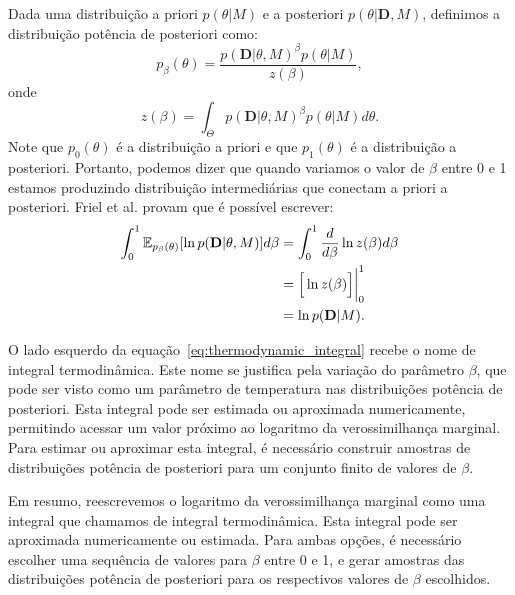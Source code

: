 \documentclass[12pt]{article}
\newcommand{\expectation}{\mathbb{E}}
\begin{document}
Dada uma distribuição a priori $p (\theta | M)$ e a posteriori $p
(\theta | \mathbf{D}, M)$, definimos a distribuição potência de
posteriori como:
\begin{equation*}
    p_{\beta} (\theta) = \frac{p (\mathbf{D} | \theta, M)^\beta 
        p(\theta | M)}{z (\beta)},
\end{equation*}
onde
\begin{equation*}
    z (\beta) = \int_\Theta p (\mathbf{D} | \theta, M)^\beta 
        p(\theta | M) d\theta.
\end{equation*}
Note que $p_{0} (\theta)$ é a distribuição a priori e que $p_{1}
(\theta)$ é a distribuição a posteriori. Portanto, podemos dizer que
quando variamos o valor de $\beta$ entre 0 e 1 estamos produzindo
distribuição intermediárias que conectam a priori a posteriori. Friel et
al. provam que é possível escrever:
\begin{align}
    \int_0^1 \expectation_{p_\beta (\theta)} 
        [\ln p(\mathbf{D}|\theta, M)]d\beta 
    &= \int_0^1 \frac{d}{d\beta} \ln z(\beta) d\beta \notag \\
    &= \Big[\ln z(\beta)\Big]\bigg\rvert^1_0 \notag \\
    &= \ln p (\mathbf{D} | M).
    \label{eq:thermodynamic_integral}
\end{align}

O lado esquerdo da equação~\ref{eq:thermodynamic_integral} recebe o nome 
de integral termodinâmica. Este nome se justifica pela variação do
parâmetro $\beta$, que pode ser visto como um parâmetro de temperatura
nas distribuições potência de posteriori. Esta integral pode ser
estimada ou aproximada numericamente, permitindo acessar um valor 
próximo ao logaritmo da verossimilhança marginal. Para estimar ou
aproximar esta integral, é necessário construir amostras de
distribuições potência de posteriori para um conjunto finito de valores
de $\beta$.

Em resumo, reescrevemos o logaritmo da verossimilhança marginal como uma
integral que chamamos de integral termodinâmica. Esta integral pode ser
aproximada numericamente ou estimada. Para ambas opções, é necessário 
escolher uma sequência de valores para $\beta$ entre 0 e 1, e gerar
amostras das distribuições potência de posteriori para os respectivos
valores de $\beta$ escolhidos.
\end{document}
